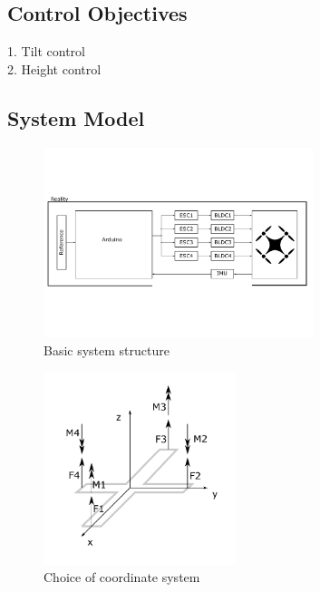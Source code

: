 		
\subsection{Control Objectives}
1. Tilt control \\
2. Height control 
\clearpage

\subsection{System Model}
\begin{figure}[htb!]
	\centering
	\includegraphics[width=0.7\textwidth]{01_figures/intro_basicSystem}
	\caption{Basic system structure}
	\label{fig:intro_basicSystem}
\end{figure}
\clearpage

\begin{figure}[htb!]
	\centering
	\includegraphics[width=0.5\textwidth]{01_figures/intro_cosChoice}
	\caption{Choice of coordinate system}
	\label{fig:intro_cos}
\end{figure}

